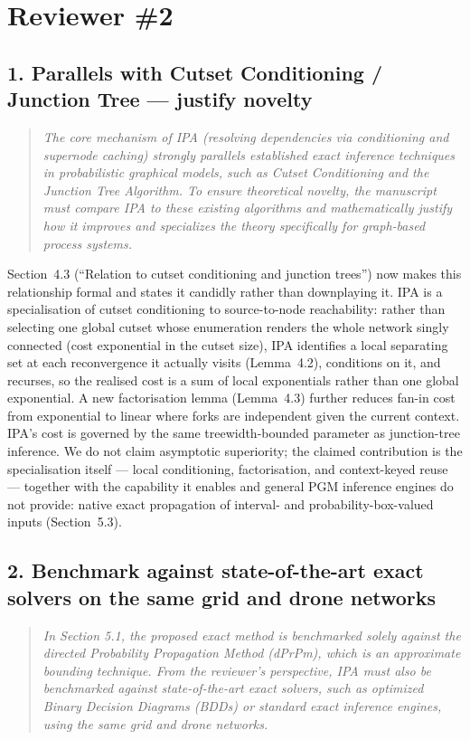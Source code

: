 \documentclass[11pt]{article}
\newenvironment{revcomment}
  {\begin{quote}\itshape\color{gray!60!black}}
  {\end{quote}}
\begin{document}
\section*{Reviewer \#2}

\subsection*{1. Parallels with Cutset Conditioning / Junction Tree --- justify novelty}
\begin{revcomment}
The core mechanism of IPA (resolving dependencies via conditioning and supernode caching) strongly parallels established exact inference techniques in probabilistic graphical models, such as Cutset Conditioning and the Junction Tree Algorithm. To ensure theoretical novelty, the manuscript must compare IPA to these existing algorithms and mathematically justify how it improves and specializes the theory specifically for graph-based process systems.
\end{revcomment}

Section~4.3 (``Relation to cutset conditioning and junction trees'') now makes this relationship formal and states it candidly rather than downplaying it. IPA is a specialisation of cutset conditioning to source-to-node reachability: rather than selecting one global cutset whose enumeration renders the whole network singly connected (cost exponential in the cutset size), IPA identifies a local separating set at each reconvergence it actually visits (Lemma~4.2), conditions on it, and recurses, so the realised cost is a sum of local exponentials rather than one global exponential. A new factorisation lemma (Lemma~4.3) further reduces fan-in cost from exponential to linear where forks are independent given the current context. IPA's cost is governed by the same treewidth-bounded parameter as junction-tree inference. We do not claim asymptotic superiority; the claimed contribution is the specialisation itself --- local conditioning, factorisation, and context-keyed reuse --- together with the capability it enables and general PGM inference engines do not provide: native exact propagation of interval- and probability-box-valued inputs (Section~5.3).

\subsection*{2. Benchmark against state-of-the-art exact solvers on the same grid and drone networks}
\begin{revcomment}
In Section 5.1, the proposed exact method is benchmarked solely against the directed Probability Propagation Method (dPrPm), which is an approximate bounding technique. From the reviewer's perspective, IPA must also be benchmarked against state-of-the-art exact solvers, such as optimized Binary Decision Diagrams (BDDs) or standard exact inference engines, using the same grid and drone networks.
\end{revcomment}
\end{document}
